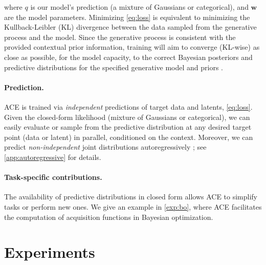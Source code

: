 \documentclass[twoside]{article}
\begin{document}
\noindent where $q$ is our model's prediction (a mixture of Gaussians or categorical), and $\textbf{w}$ are the model parameters. Minimizing \cref{eq:loss} is equivalent to minimizing the Kullback-Leibler (KL) divergence between the data sampled from the generative process and the model. %
Since the generative process is consistent with the provided contextual prior information, training will aim to converge (KL-wise) as close as possible, for the model capacity, to the correct Bayesian posteriors and predictive distributions for the specified generative model and priors \citep{muller2022transformers, elsemueller2024sensitivity}.

\vspace{-0.25em}
\paragraph{Prediction.} ACE is trained via \emph{independent} predictions of target data and latents, \cref{eq:loss}. Given the closed-form likelihood (mixture of Gaussians or categorical), we can easily evaluate or sample from the predictive distribution at any desired target point (data or latent) in parallel, conditioned on the context. Moreover, we can predict \emph{non-independent} joint distributions autoregressively \citep{nguyen2022transformer,bruinsma2023autoregressive}; see \cref{app:autoregressive} for details.

\begin{tcolorbox}[colback=red!5!white,colframe=red!75!black]
\paragraph{Task-specific contributions.} The availability of predictive distributions in closed form allows ACE to simplify tasks or perform new ones. We give an example in \cref{exp:bo}, where ACE facilitates the computation of acquisition functions in Bayesian optimization.
\end{tcolorbox}




\vspace{-0.25em}
\section{Experiments}
\label{sec:experiments}
\end{document}
